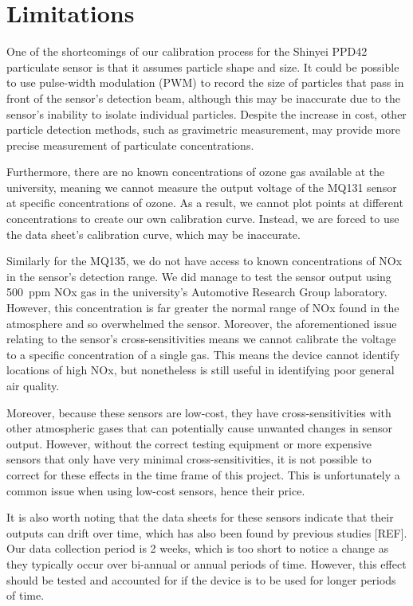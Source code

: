 \documentclass[11pt]{report}
\begin{document}
\section{Limitations}

One of the shortcomings of our calibration process for the Shinyei PPD42 particulate sensor is that it assumes particle shape and size. It could be possible to use pulse-width modulation (PWM) to record the size of particles that pass in front of the sensor's detection beam, although this may be inaccurate due to the sensor's inability to isolate individual particles. Despite the increase in cost, other particle detection methods, such as gravimetric measurement, may provide more precise measurement of particulate concentrations.

Furthermore, there are no known concentrations of ozone gas available at the university, meaning we cannot measure the output voltage of the MQ131 sensor at specific concentrations of ozone. As a result, we cannot plot points at different concentrations to create our own calibration curve. Instead, we are forced to use the data sheet's calibration curve, which may be inaccurate.

Similarly for the MQ135, we do not have access to known concentrations of NOx in the sensor's detection range. We did manage to test the sensor output using 500~ppm NOx gas in the university's Automotive Research Group laboratory. However, this concentration is far greater the normal range of NOx found in the atmosphere and so overwhelmed the sensor. Moreover, the aforementioned issue relating to the sensor's cross-sensitivities means we cannot calibrate the voltage to a specific concentration of a single gas. This means the device cannot identify locations of high NOx, but nonetheless is still useful in identifying poor general air quality.


Moreover, because these sensors are low-cost, they have cross-sensitivities with other atmospheric gases that can potentially cause unwanted changes in sensor output. However, without the correct testing equipment or more expensive sensors that only have very minimal cross-sensitivities, it is not possible to correct for these effects in the time frame of this project. This is unfortunately a common issue when using low-cost sensors, hence their price.

It is also worth noting that the data sheets for these sensors indicate that their outputs can drift over time, which has also been found by previous studies [REF]. Our data collection period is 2 weeks, which is too short to notice a change as they typically occur over bi-annual or annual periods of time. However, this effect should be tested and accounted for if the device is to be used for longer periods of time.
\end{document}
